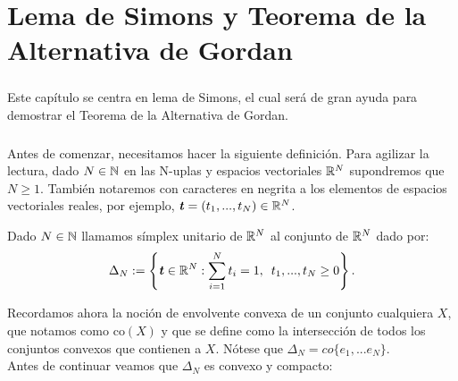 \chapter{Lema de Simons y Teorema de la Alternativa de Gordan}
	\thispagestyle{empty}
	\newcommand{\ttt}{\textbf{\emph{t}}}
	\newcommand{\sss}{\textbf{\emph{s}}}
	\newcommand{\xx}{\textbf{\emph{x}}}
	\newcommand{\yy}{\textbf{\emph{y}}}
	
	\paragraph{}Este capítulo se centra en lema de Simons, el cual será de gran ayuda para demostrar el Teorema de la Alternativa de Gordan.

	\paragraph{}Antes de comenzar, necesitamos hacer la siguiente definición. Para agilizar la lectura, dado $ N\in \mathbb{N} $ en las N-uplas y espacios vectoriales $ \mathbb{R}^N $ supondremos que $ N \geq 1 $. También notaremos con caracteres en negrita a los elementos de espacios vectoriales reales, por ejemplo, $  \ttt = (t_1,...,t_N)\in \RR^N$. 
	
	\begin{definicion}
		Dado $ N \in \mathbb{N} $ llamamos símplex unitario de $ \mathbb{R}^N $ al conjunto de $ \mathbb{R}^N $ dado por:
		\begin{equation*}
			\Delta_N := \left\lbrace \ttt \in \RR^N: \sum_{i=1}^{N}{t_i} = 1, \hspace{0.5em} t_1,...,t_N \geq 0 \right\rbrace .
		\end{equation*}
	\end{definicion}

	Recordamos ahora la noción de envolvente convexa de un conjunto cualquiera $ X $, que notamos como $ \mathrm{co}(X) $ y que se define como la intersección de todos los conjuntos convexos que contienen a $ X $. Nótese que $ \Delta_N = co\{e_1,...e_N\} $. \\
	
	Antes de continuar veamos que $ \Delta_N $ es convexo y compacto:
	
